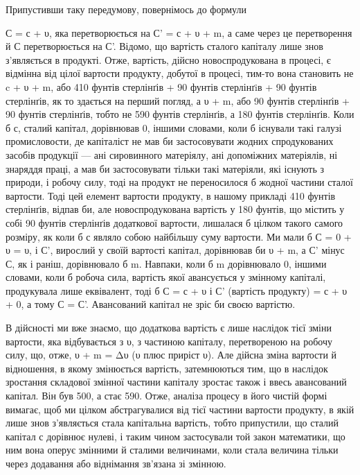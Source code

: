 Припустивши таку передумову, повернімось до формули

С = с + υ, яка перетворюється на С' = с + υ + m, а саме через це
перетворення й С перетворюється на С'. Відомо, що вартість сталого
капіталу лише знов з’являється в продукті. Отже, вартість,
дійсно новоспродукована в процесі, є відмінна від цілої вартости
продукту, добутої в процесі, тим-то вона становить не
c + υ + m, або 410 фунтів стерлінґів + 90 фунтів стерлінґiв + 90 фунтів
стерлінґів, як то здається на перший погляд, а υ + m, або
90 фунтів стерлінґів + 90 фунтів стерлінґів, тобто не 590 фунтів
стерлінґів, а 180 фунтів стерлінґів. Коли б с, сталий капітал,
дорівнював 0, іншими словами, коли б існували такі галузі промисловости,
де капіталіст не мав би застосовувати жодних спродукованих
засобів продукції — ані сировинного матеріялу, ані
допоміжних матеріялів, ні знаряддя праці, а мав би застосовувати
тільки такі матеріяли, які існують з природи, і робочу
силу, тоді на продукт не переносилося б жодної частини сталої
вартости. Тоді цей елемент вартости продукту, в нашому прикладі
410 фунтів стерлінґів, відпав би, але новоспродукована вартість
у 180 фунтів, що містить у собі 90 фунтів стерлінґів додаткової
вартости, лишалася б цілком такого самого розміру, як коли б
с являло собою найбільшу суму вартости. Ми мали б С = 0 + υ = υ,
і С', вирослий у своїй вартості капітал, дорівнював би υ + m, а
С' мінус С, як і раніш, дорівнювало б m. Навпаки, коли б m дорівнювало
0, іншими словами, коли б робоча сила, вартість якої
авансується у змінному капіталі, продукувала лише еквівалент,
тоді б С = с + υ і С' (вартість продукту) = с + υ + 0, а тому С = С'.
Авансований капітал не зріс би своєю вартістю.

В дійсності ми вже знаємо, що додаткова вартість є лише наслідок
тієї зміни вартости, яка відбувається з υ, з частиною капіталу,
перетвореною на робочу силу, що, отже, υ + m = Δυ (υ плюс
приріст υ). Але дійсна зміна вартости й відношення, в якому
змінюється вартість, затемнюються тим, що в наслідок зростання
складової змінної частини капіталу зростає також і ввесь авансований
капітал. Він був 500, а стає 590. Отже, аналіза процесу в його
чистій формі вимагає, щоб ми цілком абстрагувалися від тієї
частини вартости продукту, в якій лише знов з’являється стала
капітальна вартість, тобто припустили, що сталий капітал с
дорівнює нулеві, і таким чином застосували той закон математики,
що ним вона оперує змінними й сталими величинами, коли
стала величина тільки через додавання або віднімання зв’язана
зі змінною.
